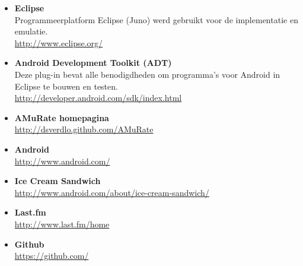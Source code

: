 \documentclass[11pt,a4paper]{article}
\begin{document}
	\begin{itemize}
			
	\item \textbf{Eclipse} \\
	Programmeerplatform Eclipse (Juno) werd gebruikt voor de implementatie en emulatie.	\\
	\url{http://www.eclipse.org/}

	\item \textbf{Android Development Toolkit (ADT)} \\
	Deze plug-in bevat alle benodigdheden om programma's voor Android in Eclipse te bouwen en testen.\\
	\url{http://developer.android.com/sdk/index.html}

	\item \textbf{AMuRate homepagina} \\
		\url{http://dsverdlo.github.com/AMuRate}
		
	\item \textbf{Android} \\
		\url{http://www.android.com/}
		
	\item \textbf{Ice Cream Sandwich} \\
		\url{http://www.android.com/about/ice-cream-sandwich/}	
		
	\item \textbf{Last.fm} \\
		\url{http://www.last.fm/home}	
		
	\item \textbf{Github} \\
		\url{https://github.com/}



	\end{itemize}
\end{document}
